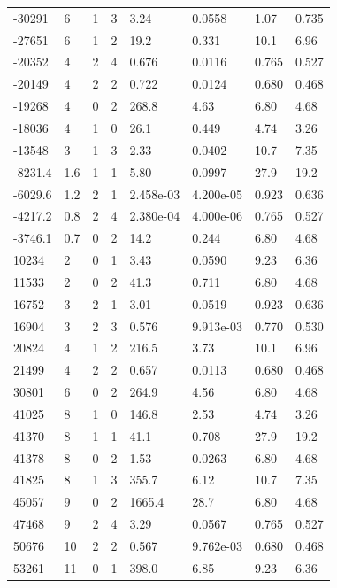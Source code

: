\documentclass[preview]{standalone}
\begin{document}
{{\begin{tabular}{L{1.2cm}C{1.2cm} C{0.3cm}C{0.5cm} C{1.4cm}C{1.4cm} C{1.4cm}C{1.4cm}}
  -30291  &     6  & 1     &  3 &  3.24  & 0.0558  & 1.07 &  0.735   \\ 
  -27651  &     6  & 1     &  2 &  19.2  & 0.331  & 10.1 &  6.96   \\ 
  -20352  &     4  & 2     &  4 &  0.676  & 0.0116  & 0.765 &  0.527   \\ 
  -20149  &     4  & 2     &  2 &  0.722  & 0.0124  & 0.680 &  0.468   \\ 
  -19268  &     4  & 0     &  2 &  268.8  & 4.63  & 6.80 &  4.68   \\ 
  -18036  &     4  & 1     &  0 &  26.1  & 0.449  & 4.74 &  3.26   \\ 
  -13548  &     3  & 1     &  3 &  2.33  & 0.0402  & 10.7 &  7.35   \\ 
  -8231.4  &   1.6  & 1     &  1 &  5.80  & 0.0997  & 27.9 &  19.2   \\ 
  -6029.6  &   1.2  & 2     &  1 &  2.458e-03  & 4.200e-05  & 0.923 &  0.636   \\ 
  -4217.2  &   0.8  & 2     &  4 &  2.380e-04  & 4.000e-06  & 0.765 &  0.527   \\ 
  -3746.1  &   0.7  & 0     &  2 &  14.2  & 0.244  & 6.80 &  4.68   \\ 
  10234  &     2  & 0     &  1 &  3.43  & 0.0590  & 9.23 &  6.36   \\ 
  11533  &     2  & 0     &  2 &  41.3  & 0.711  & 6.80 &  4.68   \\ 
  16752  &     3  & 2     &  1 &  3.01  & 0.0519  & 0.923 &  0.636   \\ 
  16904  &     3  & 2     &  3 &  0.576  & 9.913e-03  & 0.770 &  0.530   \\ 
  20824  &     4  & 1     &  2 &  216.5  & 3.73  & 10.1 &  6.96   \\ 
  21499  &     4  & 2     &  2 &  0.657  & 0.0113  & 0.680 &  0.468   \\ 
  30801  &     6  & 0     &  2 &  264.9  & 4.56  & 6.80 &  4.68   \\ 
  41025  &     8  & 1     &  0 &  146.8  & 2.53  & 4.74 &  3.26   \\ 
  41370  &     8  & 1     &  1 &  41.1  & 0.708  & 27.9 &  19.2   \\ 
  41378  &     8  & 0     &  2 &  1.53  & 0.0263  & 6.80 &  4.68   \\ 
  41825  &     8  & 1     &  3 &  355.7  & 6.12  & 10.7 &  7.35   \\ 
  45057  &     9  & 0     &  2 &  1665.4  & 28.7  & 6.80 &  4.68   \\ 
  47468  &     9  & 2     &  4 &  3.29  & 0.0567  & 0.765 &  0.527   \\ 
  50676  &    10  & 2     &  2 &  0.567  & 9.762e-03  & 0.680 &  0.468   \\ 
  53261  &    11  & 0     &  1 &  398.0  & 6.85  & 9.23 &  6.36   \\ 
\hline 
\end{tabular} 

}}
\end{document}
